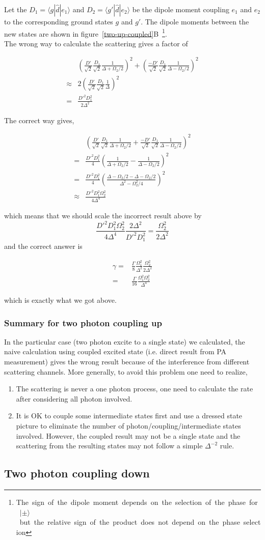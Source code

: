 \documentclass[10pt,fleqn]{article}
\newcommand{\eqar}[1]
{
  \begin{align*}
    #1
  \end{align*}
}
\newcommand{\paren}[1]{{\left({#1}\right)}}
\begin{document}
Let the $D_1=\langle g|\hat d|e_1\rangle$ and $D_2=\langle g'|\hat d|e_2\rangle$ be
the dipole moment coupling $e_1$ and $e_2$ to the corresponding ground states $g$ and $g'$.
The dipole moments between the new states are shown in \mbox{figure \ref{two-up-coupled}B
\footnote{The sign of the dipole moment depends on the selection of the phase for
  $|\pm\rangle$ but the relative sign of the product does not depend on the phase selection}.}\\

The wrong way to calculate the scattering gives a factor of
\eqar{
  &\paren{\frac{D'}{\sqrt2}\frac{D_1}{\sqrt2}\frac{1}{\Delta+\Omega_2/2}}^2+\paren{\frac{-D'}{\sqrt2}\frac{D_1}{\sqrt2}\frac{1}{\Delta-\Omega_2/2}}^2\\
  \approx&2\paren{\frac{D'}{\sqrt2}\frac{D_1}{\sqrt2}\frac{1}{\Delta}}^2\\
  =&\frac{D'^2D_1^2}{2\Delta^2}
}
The correct way gives,
\eqar{
  &\paren{\frac{D'}{\sqrt2}\frac{D_1}{\sqrt2}\frac{1}{\Delta+\Omega_2/2}+\frac{-D'}{\sqrt2}\frac{D_1}{\sqrt2}\frac{1}{\Delta-\Omega_2/2}}^2\\
  =&\frac{D'^2D_1^2}{4}\paren{\frac{1}{\Delta+\Omega_2/2}-\frac{1}{\Delta-\Omega_2/2}}^2\\
  =&\frac{D'^2D_1^2}{4}\paren{\frac{\Delta-\Omega_2/2-\Delta-\Omega_2/2}{\Delta^2-\Omega_2^2/4}}^2\\
  \approx&\frac{D'^2D_1^2\Omega_2^2}{4\Delta^4}
}
which means that we should scale the incorrect result above by
\[\frac{D'^2D_1^2\Omega_2^2}{4\Delta^4}\frac{2\Delta^2}{D'^2D_1^2}=\frac{\Omega_2^2}{2\Delta^2}\]
and the correct answer is
\eqar{
  \gamma=&\frac{\Gamma}{8}\frac{\Omega_1^2}{\Delta^2}\frac{\Omega_2^2}{2\Delta^2}\\
  =&\frac{\Gamma}{16}\frac{\Omega_1^2\Omega_2^2}{\Delta^4}
}
which is exactly what we got above.

\subsubsection{Summary for two photon coupling up}

In the particular case (two photon excite to a single state) we calculated,
the naive calculation using coupled excited state (i.e. direct result from PA measurement)
gives the wrong result because of the interference from different scattering channels.
More generally, to avoid this problem one need to realize,
\begin{enumerate}
\item The scattering is never a one photon process, one need to calculate the rate
  after considering all photon involved.
\item It is OK to couple some intermediate states first and use a dressed state picture
  to eliminate the number of photon/coupling/intermediate states involved. However,
  the coupled result may not be a single state and the scattering from the resulting
  states may not follow a simple $\Delta^{-2}$ rule.
\end{enumerate}

\subsection{Two photon coupling down}

\end{document}
